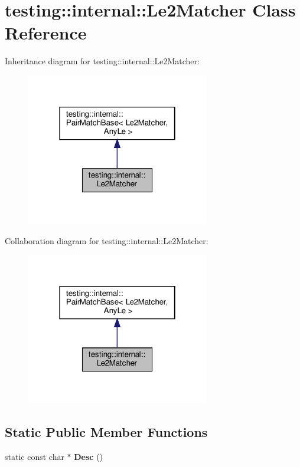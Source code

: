 \hypertarget{classtesting_1_1internal_1_1_le2_matcher}{}\section{testing\+:\+:internal\+:\+:Le2\+Matcher Class Reference}
\label{classtesting_1_1internal_1_1_le2_matcher}


Inheritance diagram for testing\+:\+:internal\+:\+:Le2\+Matcher\+:
\nopagebreak
\begin{figure}[H]
\begin{center}
\leavevmode
\includegraphics[width=226pt]{classtesting_1_1internal_1_1_le2_matcher__inherit__graph}
\end{center}
\end{figure}


Collaboration diagram for testing\+:\+:internal\+:\+:Le2\+Matcher\+:
\nopagebreak
\begin{figure}[H]
\begin{center}
\leavevmode
\includegraphics[width=226pt]{classtesting_1_1internal_1_1_le2_matcher__coll__graph}
\end{center}
\end{figure}
\subsection*{Static Public Member Functions}
\begin{DoxyCompactItemize}
\item 
\mbox{\label{classtesting_1_1internal_1_1_le2_matcher_a92e2aca3f09bb687895b10c272cb392f}} 
static const char $\ast$ {\bfseries Desc} ()
\end{DoxyCompactItemize}
